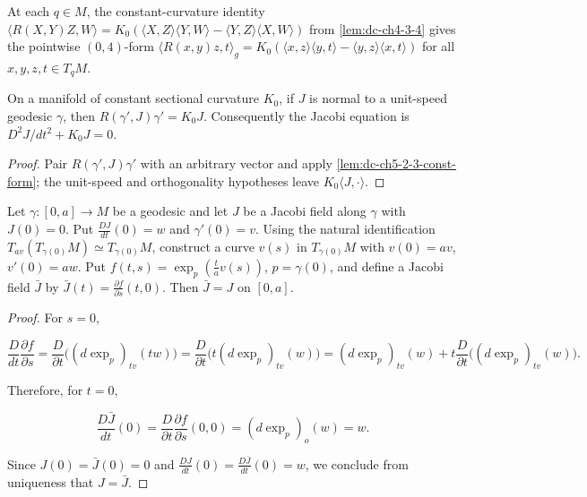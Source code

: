 \begin{lemma}
  \label{lem:dc-ch5-2-3-const-form}


  At each $q\in M$, the constant-curvature identity
  $\langle R(X,Y)Z,W\rangle=K_0(\langle X,Z\rangle\langle Y,W\rangle-\langle Y,Z\rangle\langle X,W\rangle)$
  from \cref{lem:dc-ch4-3-4} gives the pointwise $(0,4)$-form
  $\langle R(x,y)z,t\rangle_g=K_0(\langle x,z\rangle\langle y,t\rangle-\langle y,z\rangle\langle x,t\rangle)$
  for all $x,y,z,t\in T_qM$.
\end{lemma}

\begin{lemma}[constant curvature: $R(\gamma',J)\gamma'=K J$, coordinate form]
  \label{lem:dc-ch5-2-3-jacobi-op}


  On a manifold of constant sectional curvature $K_0$, if $J$ is normal to a
  unit-speed geodesic $\gamma$, then
  $R(\gamma',J)\gamma'=K_0J$. Consequently the Jacobi equation is
  $D^2J/dt^2+K_0J=0$.
\end{lemma}
\begin{proof}

  \sketch
  Pair $R(\gamma',J)\gamma'$ with an arbitrary vector and apply
  \cref{lem:dc-ch5-2-3-const-form}; the unit-speed and orthogonality hypotheses
  leave $K_0\langle J,\cdot\rangle$.
\end{proof}

\begin{proposition}
  \label{prop:dc-ch5-2-4}


  Let $\gamma:[0,a]\to M$ be a geodesic and let $J$ be a Jacobi field along
  $\gamma$ with $J(0)=0$. Put $\frac{DJ}{dt}(0)=w$ and $\gamma'(0)=v$. Using the
  natural identification $T_{av}(T_{\gamma(0)}M)\simeq T_{\gamma(0)}M$, construct a
  curve $v(s)$ in $T_{\gamma(0)}M$ with $v(0)=av$, $v'(0)=aw$. Put
  $f(t,s)=\exp_p(\frac{t}{a}v(s))$,
  $p=\gamma(0)$, and define a Jacobi field $\bar J$ by
  $\bar J(t)=\frac{\partial f}{\partial s}(t,0)$. Then $\bar J=J$ on $[0,a]$.
\end{proposition}
\begin{proof}

  \sketch
  For $s=0$,

  $$
  \frac{D}{dt}\frac{\partial f}{\partial s}=\frac{D}{\partial t}\big((d\exp_p)_{tv}(tw)\big)
  =\frac{D}{\partial t}\big(t(d\exp_p)_{tv}(w)\big)
  =(d\exp_p)_{tv}(w)+t\frac{D}{\partial t}\big((d\exp_p)_{tv}(w)\big).
  $$

  Therefore, for $t=0$,

  $$
  \frac{D\bar J}{dt}(0)=\frac{D}{\partial t}\frac{\partial f}{\partial s}(0,0)=(d\exp_p)_o(w)=w.
  $$

  Since $J(0)=\bar J(0)=0$ and $\frac{DJ}{dt}(0)=\frac{D\bar J}{dt}(0)=w$, we
  conclude from uniqueness that $J=\bar J$.
\end{proof}

